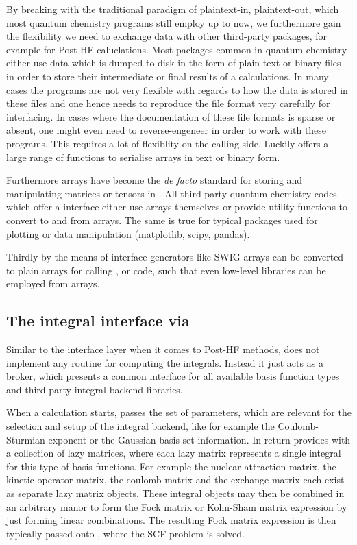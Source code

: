 By breaking with the traditional paradigm of plaintext-in, plaintext-out,
which most quantum chemistry programs still employ up to now,
we furthermore gain the flexibility we need to exchange data with
other third-party packages, for example for Post-HF caluclations.
Most packages common in quantum chemistry either use data which is
dumped to disk in the form of plain text or binary files
in order to store their intermediate or final results of
a calculations.
In many cases the programs are not very flexible with regards to
how the data is stored in these files and one hence needs to reproduce
the file format very carefully for interfacing.
In cases where the documentation of these file formats is sparse
or absent,
one might even need to reverse-engeneer in order to work with these programs.
This requires a lot of flexiblity on the calling side.
Luckily \python offers a large range of functions to serialise \numpy
arrays in text or binary form.

Furthermore \numpy arrays have become the \textit{de facto} standard
for storing and manipulating matrices or tensors in \python.
All third-party quantum chemistry codes which
offer a \python interface
either use \numpy arrays themselves or
provide utility functions to convert to and
from \numpy arrays.
The same is true for typical \python packages used for plotting or
data manipulation (matplotlib, scipy, pandas).

Thirdly by the means of interface generators
like SWIG  \numpy arrays can be converted to plain
\cee arrays for calling \cpp, \cee or \fortran code,
such that even low-level libraries can be employed
from \numpy arrays.

%
%
\subsection{The integral interface via \gint}
Similar to the \molsturm interface layer when it comes to Post-HF methods,
\gint does not implement any routine for computing the integrals.
Instead it just acts as a broker,
which presents a common interface for all available basis function types
and third-party integral backend libraries.

When a calculation starts,
\molsturm passes \gint the set of parameters,
which are relevant for the selection and setup of the integral backend,
like for example the Coulomb-Sturmian exponent or the Gaussian basis set information.
In return \gint provides \molsturm with a collection of lazy matrices,
where each lazy matrix represents a single integral for this
type of basis functions.
For example the nuclear attraction matrix, the kinetic operator matrix,
the coulomb matrix and the exchange matrix each exist as separate
lazy matrix objects.
These integral objects may then be combined
in an arbitrary manor to form the Fock matrix or Kohn-Sham matrix
expression by just forming linear combinations.
The resulting Fock matrix expression is then typically passed onto \gscf,
where the SCF problem is solved.

